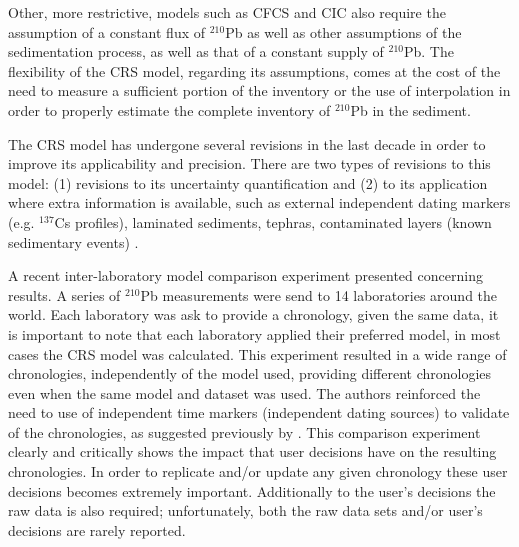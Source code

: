 \documentclass [10pt] {article}
\begin{document}
Other, more restrictive, models such as CFCS and CIC also require the assumption of a constant flux of $^{210}$Pb as well as other assumptions of the sedimentation process, as well as that of a constant supply of $^{210}$Pb.
The flexibility of the CRS model, regarding its assumptions, comes at the cost of the need to measure a sufficient portion of the inventory or the use of interpolation in order to properly estimate the complete inventory of $^{210}$Pb in the sediment. 

The CRS model has undergone several revisions in the last decade in order to improve its applicability and precision. 
There are two types of revisions to this model: (1) revisions to its uncertainty quantification \citep[eg. ][]{Binford1990,Appleby2001,Sanchez-Cabeza2014} and (2) to its application where extra information is available, such as external independent dating markers (e.g. $^{137}$Cs profiles), laminated sediments, tephras, contaminated layers (known sedimentary events) \citep[eg.][]{Appleby1998,Appleby2001,Appleby2008}. 

A recent inter-laboratory model comparison experiment \citep{Barsanti2020} presented concerning results.
A series of $^{210}$Pb measurements were send to 14 laboratories around the world.
Each laboratory was ask to provide a chronology, given the same data, it is important to note that each laboratory applied their preferred model, in most cases the CRS model was calculated.
This experiment resulted in a wide range of chronologies, independently of the model used, providing different chronologies even when the same model and dataset was used.
The authors reinforced the need to use of independent time markers (independent dating sources) to validate of the chronologies, as suggested previously by \citep{Smith2001}.  
This comparison experiment clearly and critically shows the impact that user decisions have on the resulting chronologies.
In order to replicate and/or update any given chronology these user decisions becomes extremely important.
Additionally to the user's decisions the raw data is also required; unfortunately, both the raw data sets and/or user's decisions are rarely reported.
\end{document}
